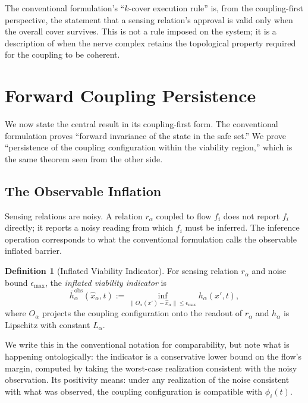 \documentclass[11pt]{article}
\theoremstyle{definition}
\newtheorem{definition}[theorem]{Definition}
\theoremstyle{remark}
\begin{document}
The conventional formulation's ``$k$-cover execution rule'' is, from the coupling-first perspective, the statement that a sensing relation's approval is valid only when the overall cover survives. This is not a rule imposed on the system; it is a description of when the nerve complex retains the topological property required for the coupling to be coherent.

\section{Forward Coupling Persistence}

We now state the central result in its coupling-first form. The conventional formulation proves ``forward invariance of the state in the safe set.'' We prove ``persistence of the coupling configuration within the viability region,'' which is the same theorem seen from the other side.

\subsection{The Observable Inflation}

Sensing relations are noisy. A relation $r_\alpha$ coupled to flow $f_i$ does not report $f_i$ directly; it reports a noisy reading from which $f_i$ must be inferred. The inference operation corresponds to what the conventional formulation calls the observable inflated barrier.

\begin{definition}[Inflated Viability Indicator]
For sensing relation $r_\alpha$ and noise bound $\epsilon_{\max}$, the \emph{inflated viability indicator} is
\begin{equation}
\bar h_\alpha^{\mathrm{obs}}(\hat x_\alpha, t) := \inf_{\|O_\alpha(x') - \hat x_\alpha\| \leq \epsilon_{\max}} h_\alpha(x', t),
\end{equation}
where $O_\alpha$ projects the coupling configuration onto the readout of $r_\alpha$ and $h_\alpha$ is Lipschitz with constant $L_\alpha$.
\end{definition}

We write this in the conventional notation for comparability, but note what is happening ontologically: the indicator is a conservative lower bound on the flow's margin, computed by taking the worst-case realization consistent with the noisy observation. Its positivity means: under any realization of the noise consistent with what was observed, the coupling configuration is compatible with $\phi_i(t)$.
\end{document}
